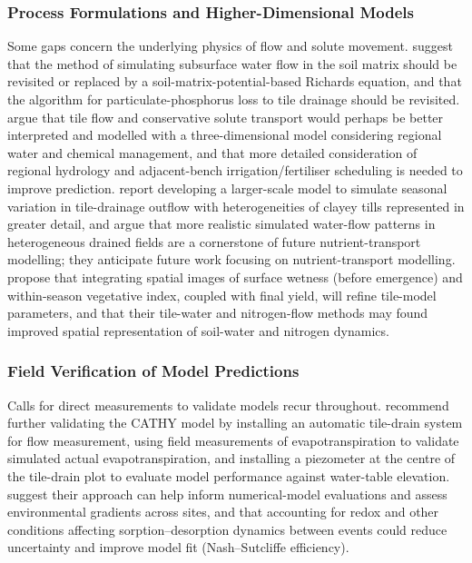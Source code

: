 \subsubsection{Process Formulations and Higher-Dimensional Models}

Some gaps concern the underlying physics of flow and solute movement. \textcite{Qi2018} suggest that the method of simulating subsurface water flow in the soil matrix should be revisited or replaced by a soil-matrix-potential-based Richards equation, and that the algorithm for particulate-phosphorus loss to tile drainage should be revisited. \textcite{Mohanty1998} argue that tile flow and conservative solute transport would perhaps be better interpreted and modelled with a three-dimensional model considering regional water and chemical management, and that more detailed consideration of regional hydrology and adjacent-bench irrigation/fertiliser scheduling is needed to improve prediction. \textcite{DeSchepper2015} report developing a larger-scale model to simulate seasonal variation in tile-drainage outflow with heterogeneities of clayey tills represented in greater detail, and argue that more realistic simulated water-flow patterns in heterogeneous drained fields are a cornerstone of future nutrient-transport modelling; they anticipate future work focusing on nutrient-transport modelling. \textcite{Garrison1999} propose that integrating spatial images of surface wetness (before emergence) and within-season vegetative index, coupled with final yield, will refine tile-model parameters, and that their tile-water and nitrogen-flow methods may found improved spatial representation of soil-water and nitrogen dynamics.

\subsubsection{Field Verification of Model Predictions}

Calls for direct measurements to validate models recur throughout. \textcite{Muma2017} recommend further validating the CATHY model by installing an automatic tile-drain system for flow measurement, using field measurements of evapotranspiration to validate simulated actual evapotranspiration, and installing a piezometer at the centre of the tile-drain plot to evaluate model performance against water-table elevation. \textcite{Nazari2021} suggest their approach can help inform numerical-model evaluations and assess environmental gradients across sites, and that accounting for redox and other conditions affecting sorption--desorption dynamics between events could reduce uncertainty and improve model fit (Nash--Sutcliffe efficiency).

